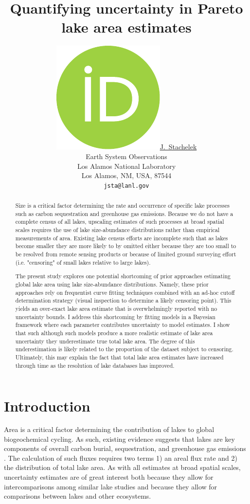 \documentclass{article}
\title{Quantifying uncertainty in Pareto lake area estimates}
\author{ \href{https://orcid.org/0000-0002-5924-2464}{\includegraphics[scale=0.06]{orcid.pdf}\hspace{1mm}J.~Stachelek} \\
	Earth System Observations\\
	Los Alamos National Laboratory\\
	Los Alamos, NM, USA, 87544 \\
	\texttt{jsta@lanl.gov} \\
}
\begin{document}
\maketitle

\begin{abstract}
	Size is a critical factor determining the rate and occurrence of specific lake processes such as carbon sequestration and greenhouse gas emissions. Because we do not have a complete census of all lakes, upscaling estimates of such processes at broad spatial scales requires the use of lake size-abundance distributions rather than empirical measurements of area. Existing lake census efforts are incomplete such that as lakes become smaller they are more likely to by omitted either because they are too small to be resolved from remote sensing products or because of limited ground surveying effort (i.e. "censoring" of small lakes relative to large lakes).

	The present study explores one potential shortcoming of prior approaches estimating global lake area using lake size-abundance distributions. Namely, these prior approaches rely on frequentist curve fitting techniques combined with an ad-hoc cutoff determination strategy (visual inspection to determine a likely censoring point). This yields an over-exact lake area estimate that is overwhelmingly reported with no uncertainty bounds. I address this shortcoming by fitting models in a Bayesian framework where each parameter contributes uncertainty to model estimates. I show that such although such models produce a more realistic estimate of lake area uncertainty they underestimate true total lake area. The degree of this underestimation is likely related to the proportion of the dataset subject to censoring. Ultimately, this may explain the fact that total lake area estimates have increased through time as the resolution of lake databases has improved.
\end{abstract}

\section{Introduction}
Area is a critical factor determining the contribution of lakes to global biogeochemical cycling. As such, existing evidence suggests that lakes are key components of overall carbon burial, sequestration, and greenhouse gas emissions \citep{delsontroGreenhouseGasEmissions2018, kellerGlobalCarbonBudget2021}. The calculation of such fluxes requires two terms 1) an areal flux rate and 2) the distribution of total lake area. As with all estimates at broad spatial scales, uncertainty estimates are of great interest both because they allow for intercomparisons among similar lake studies and because they allow for comparisons between lakes and other ecosystems.
\end{document}
